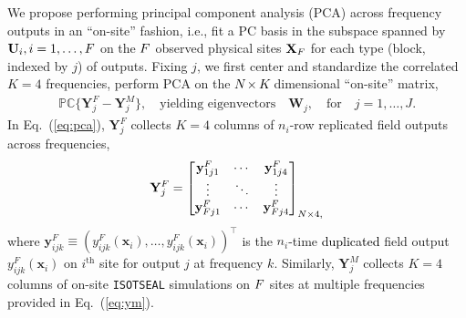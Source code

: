 \documentclass[12pt]{article}
\newcommand{\blu}[1]{\textcolor{black}{#1}} %
\newcommand{\blunew}[1]{\textcolor{black}{#1}} %
\begin{document}
We propose performing principal component analysis (PCA) across frequency
outputs in an ``on-site'' fashion, i.e., fit a PC basis in the subspace spanned
by $\mathbf{U}_i, i=1,\dots, \blunew{F}$ on the $\blunew{F}$ observed physical sites
$\mathbf{X}_{\blunew{F}}$ for each type (block, indexed by $j$) of outputs. Fixing
$j$, we first center and standardize the correlated $K=4$ frequencies, perform
PCA on the \blunew{$N \times K$} dimensional ``on-site'' matrix,
\begin{align}
\mathbb{PC} \{ \mathbf{Y}_j^F - \mathbf{Y}_j^M \},  \quad \mbox{yielding eigenvectors} \quad \mathbf{W}_j, \quad 
\text{for} \quad j = 1, \dots, J.
\label{eq:pca}
\end{align}
In Eq.~(\ref{eq:pca}),  $\mathbf{Y}_j^F$ collects $K=4$ columns of
$n_i$-row  replicated field outputs across frequencies, 
 \begin{align} 
 \mathbf{Y}_j^F =
\begin{bmatrix} \mathbf{y}^F_{1j1} & \cdots %
& \mathbf{y}^F_{1j4} \\
 \vdots %
 & \ddots & \vdots \\
\mathbf{y}^F_{{\blunew{F}} j1} & \cdots %
& \mathbf{y}^F_{{\blunew{F}}j4} \\ \end{bmatrix}_{\blunew{N} \times 4,}
\label{eq:YF}
\end{align}
where $ \mathbf{y}^F_{ijk}\equiv (y^F_{ijk}(\mathbf{x}_i), \dots,
y^F_{ijk}(\mathbf{x}_i) )^\top$ is the $n_i$-time \blu{duplicated} field output
$y^F_{ijk}(\mathbf{x}_i)$ on $i^\mathrm{th}$ site for output $j$ at frequency $k$.
 Similarly, $\mathbf{Y}_j^M$ collects $K=4$  columns of on-site {\tt ISOTSEAL}
 simulations on $\blunew{F}$ sites at  multiple frequencies provided in Eq.~(\ref{eq:ym}).

\end{document}
